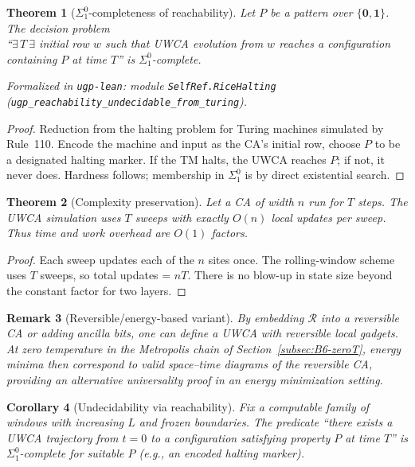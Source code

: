\documentclass[12pt]{article}
\newtheorem{theorem}{Theorem}[section]
\newtheorem{corollary}[theorem]{Corollary}
\newtheorem{remark}[theorem]{Remark}
\numberwithin{equation}{section}
\begin{document}
\begin{theorem}[$\Sigma^0_1$-completeness of reachability]\label{thm:uwca-sigma1}
Let $P$ be a pattern over $\{\mathbf{0},\mathbf{1}\}$. The decision problem\\
``$\exists\, T\ \exists$ initial row $w$ such that UWCA evolution from $w$ reaches a configuration containing $P$ at time $T$'' is $\Sigma^0_1$-complete.

\noindent\emph{Formalized in \texttt{ugp-lean}}: module \texttt{SelfRef.RiceHalting} (\texttt{ugp\_reachability\_undecidable\_from\_turing}).
\end{theorem}
\begin{proof}
Reduction from the halting problem for Turing machines simulated by Rule~110. Encode the machine and input as the CA's initial row, choose $P$ to be a designated halting marker. If the TM halts, the UWCA reaches $P$; if not, it never does. Hardness follows; membership in $\Sigma^0_1$ is by direct existential search.
\end{proof}

\begin{theorem}[Complexity preservation]\label{thm:uwca-overhead}
Let a CA of width $n$ run for $T$ steps. The UWCA simulation uses $T$ sweeps with exactly $O(n)$ local updates per sweep. Thus time and work overhead are $O(1)$ factors.
\end{theorem}
\begin{proof}
Each sweep updates each of the $n$ sites once. The rolling-window scheme uses $T$ sweeps, so total updates = $nT$. There is no blow-up in state size beyond the constant factor for two layers.
\end{proof}

\begin{remark}[Reversible/energy-based variant]
By embedding $\mathcal{R}$ into a reversible CA or adding ancilla bits, one can define a UWCA with reversible local gadgets. At zero temperature in the Metropolis chain of Section~\ref{subsec:B6-zeroT}, energy minima then correspond to valid space–time diagrams of the reversible CA, providing an alternative universality proof in an energy minimization setting.
\end{remark}

\begin{corollary}[Undecidability via reachability]
Fix a computable family of windows with increasing $L$ and frozen boundaries. The predicate “there exists a UWCA trajectory from $t{=}0$ to a configuration satisfying property $P$ at time $T$” is $\Sigma_1^0$-complete for suitable $P$ (e.g., an encoded halting marker).
\end{corollary}
\end{document}

